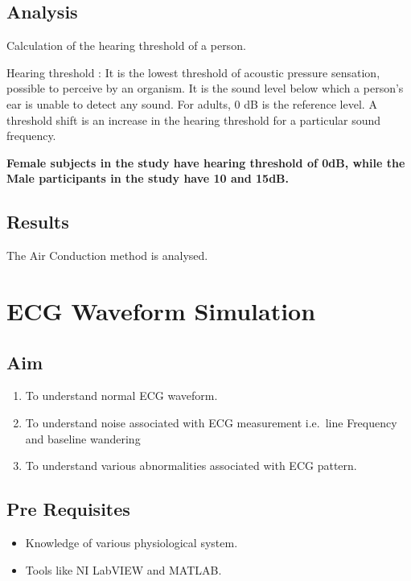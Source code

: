 \documentclass[
  11pt,
  letterpaper,
  DIV=11,
  numbers=noendperiod]{scrreprt}
\providecommand{\tightlist}{%
  \setlength{\itemsep}{0pt}\setlength{\parskip}{0pt}}\usepackage{longtable,booktabs,array}
\begin{document}
\section{Analysis}\label{analysis-4}

Calculation of the hearing threshold of a person.

Hearing threshold : It is the lowest threshold of acoustic pressure
sensation, possible to perceive by an organism. It is the sound level
below which a person's ear is unable to detect any sound. For adults, 0
dB is the reference level. A threshold shift is an increase in the
hearing threshold for a particular sound frequency.

\textbf{Female subjects in the study have hearing threshold of 0dB,
while the Male participants in the study have 10 and 15dB.}

\section{Results}\label{results}

The Air Conduction method is analysed.


\chapter{ECG Waveform Simulation}\label{ecg-waveform-simulation}

\section{Aim}\label{aim-5}

\begin{enumerate}
\def\labelenumi{\arabic{enumi}.}
\tightlist
\item
  To understand normal ECG waveform.
\item
  To understand noise associated with ECG measurement i.e.~line
  Frequency and baseline wandering
\item
  To understand various abnormalities associated with ECG pattern.
\end{enumerate}

\section{Pre Requisites}\label{pre-requisites}

\begin{itemize}
\tightlist
\item
  Knowledge of various physiological system.
\item
  Tools like NI LabVIEW and MATLAB.
\end{itemize}
\end{document}
